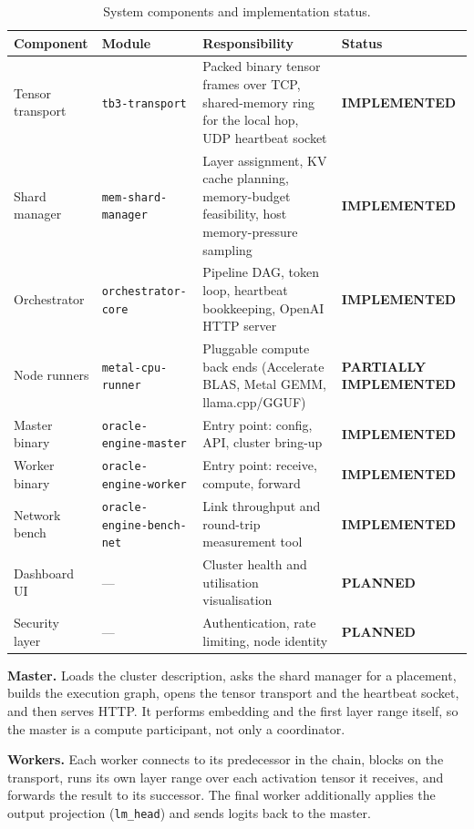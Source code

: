 \documentclass[11pt,a4paper]{article}
\newcommand{\stImp}{\textcolor{ogreen}{\footnotesize\textsf{\textbf{IMPLEMENTED}}}}
\newcommand{\stPart}{\textcolor{oamber}{\footnotesize\textsf{\textbf{PARTIALLY IMPLEMENTED}}}}
\newcommand{\stPlan}{\textcolor{oblue}{\footnotesize\textsf{\textbf{PLANNED}}}}
\begin{document}
\begin{table}[h]
\centering
\caption{System components and implementation status.}
\label{tab:components}
\footnotesize
\begin{tabularx}{\textwidth}{@{}l l X l@{}}
\toprule
\textbf{Component} & \textbf{Module} & \textbf{Responsibility} & \textbf{Status} \\
\midrule
Tensor transport & \texttt{tb3-transport} & Packed binary tensor frames over TCP,
  shared-memory ring for the local hop, UDP heartbeat socket & \stImp \\
Shard manager & \texttt{mem-shard-manager} & Layer assignment, KV cache planning,
  memory-budget feasibility, host memory-pressure sampling & \stImp \\
Orchestrator & \texttt{orchestrator-core} & Pipeline DAG, token loop, heartbeat
  bookkeeping, OpenAI HTTP server & \stImp \\
Node runners & \texttt{metal-cpu-runner} & Pluggable compute back ends
  (Accelerate BLAS, Metal GEMM, llama.cpp/GGUF) & \stPart \\
Master binary & \texttt{oracle-engine-master} & Entry point: config, API, cluster
  bring-up & \stImp \\
Worker binary & \texttt{oracle-engine-worker} & Entry point: receive, compute,
  forward & \stImp \\
Network bench & \texttt{oracle-engine-bench-net} & Link throughput and
  round-trip measurement tool & \stImp \\
Dashboard UI & --- & Cluster health and utilisation visualisation & \stPlan \\
Security layer & --- & Authentication, rate limiting, node identity & \stPlan \\
\bottomrule
\end{tabularx}
\end{table}

\textbf{Master.} Loads the cluster description, asks the shard manager for a
placement, builds the execution graph, opens the tensor transport and the
heartbeat socket, and then serves HTTP. It performs embedding and the first
layer range itself, so the master is a compute participant, not only a
coordinator.

\textbf{Workers.} Each worker connects to its predecessor in the chain, blocks on
the transport, runs its own layer range over each activation tensor it receives,
and forwards the result to its successor. The final worker additionally applies
the output projection (\texttt{lm\_head}) and sends logits back to the master.
\end{document}
